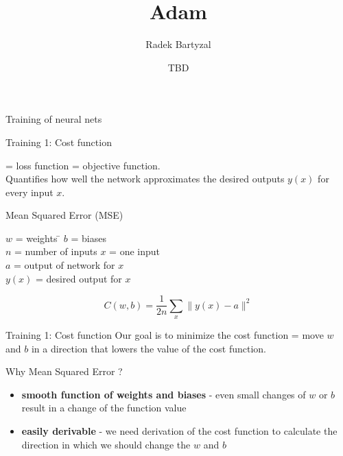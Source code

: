 \documentclass{beamer}
\begin{document}
\title{Adam}  
\author{Radek Bartyzal}
\date{TBD} 

\frame{\titlepage} 

\begin{frame}{Training of neural nets}



\end{frame}


\begin{frame}{Training 1: Cost function}

= loss function = objective function. \\
Quantifies how well the network approximates the desired outputs $y(x)$ for every input $x$. 

\begin{block}{Mean Squared Error (MSE)}
\begin{tabbing}
$w$ = weights \hspace{40mm} \= $b$ = biases\\
$n$ = number of inputs \> $x$ = one input\\
$a$ = output of network for $x$\\
$y(x)$ = desired output for $x$
\end{tabbing}
$$
C(w,b) = \frac{1}{2n} \sum_x{ \| y(x) - a \|^2}
$$
\end{block}
\end{frame}


\begin{frame}{Training 1: Cost function}
Our goal is to minimize the cost function = move $w$ and $b$ in a direction that lowers the value of the cost function.
\vfill
\begin{block}{Why Mean Squared Error ?}
\begin{itemize}
\item \textbf{smooth function of weights and biases} - even small changes of $w$ or $b$ result in a change of the function value
\item \textbf{easily derivable} - we need derivation of the cost function to calculate the direction in which we should change the $w$ and $b$
\end{itemize}
\end{block}
\end{frame}
\end{document}
